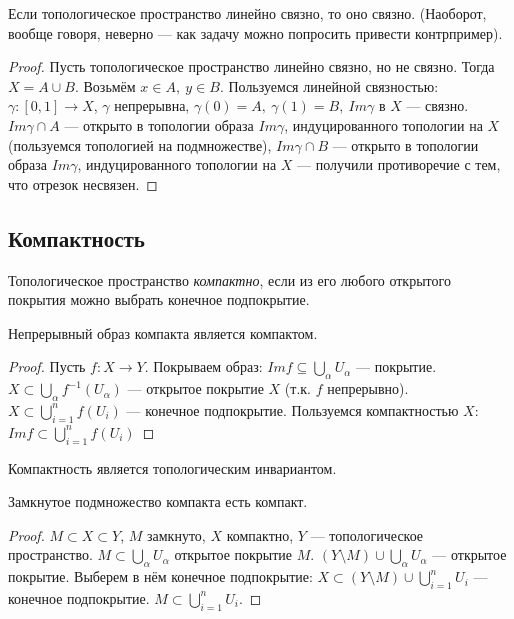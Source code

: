 \begin{statement}
    Если топологическое пространство линейно связно, то оно связно. (Наоборот, вообще говоря, неверно — как задачу можно попросить привести контрпример).
\end{statement}
\begin{proof}
    Пусть топологическое пространство линейно связно, но не связно. Тогда $X = A \cup B$. Возьмём $x \in A, \ y \in B$. Пользуемся линейной связностью: $\gamma: [0, 1] \to X$, $\gamma$ непрерывна, $\gamma(0) = A, \ \gamma(1) = B, \ Im \gamma$ в $X$ — связно.
    $Im \gamma \cap A$ — открыто в топологии образа $Im \gamma$, индуцированного топологии на $X$ (пользуемся топологией на подмножестве), $Im \gamma \cap B$ — открыто в топологии образа $Im \gamma$, индуцированного топологии на $X$ — получили противоречие с тем, что отрезок несвязен.
\end{proof}


\subsection{Компактность}
\begin{definition}
    Топологическое пространство \textit{компактно}, если из его любого открытого покрытия можно выбрать конечное подпокрытие.
\end{definition}

\begin{statement}
    Непрерывный образ компакта является компактом.
\end{statement}
\begin{proof}
    Пусть $f: X \to Y$. Покрываем образ: $Im f \subseteq \bigcup_{\alpha} U_{\alpha}$ — покрытие.
    $X \subset \bigcup_{\alpha} f^{-1}(U_{\alpha})$ — открытое покрытие $X$ (т.к. $f$ непрерывно).
    $X \subset \bigcup_{i = 1}^{n} f(U_{i})$ — конечное подпокрытие.
    Пользуемся компактностью $X$: $Im f \subset \bigcup_{i = 1}^{n} f(U_{i})$
\end{proof}

\begin{remark}
    Компактность является топологическим инвариантом.
\end{remark}

\begin{statement}
    Замкнутое подмножество компакта есть компакт.
\end{statement}
\begin{proof}
    $M \subset X \subset Y$, $M$ замкнуто, $X$ компактно, $Y$ — топологическое пространство.
    $M \subset \bigcup_{\alpha} U_{\alpha}$ открытое покрытие $M$.
    $(Y \setminus M) \cup \bigcup_{\alpha} U_{\alpha}$ — открытое покрытие.
    Выберем в нём конечное подпокрытие:
    $X \subset (Y \setminus M) \cup \bigcup_{i = 1}^n U_i$ — конечное подпокрытие.
    $M \subset \bigcup_{i = 1}^n U_i$.
\end{proof}


